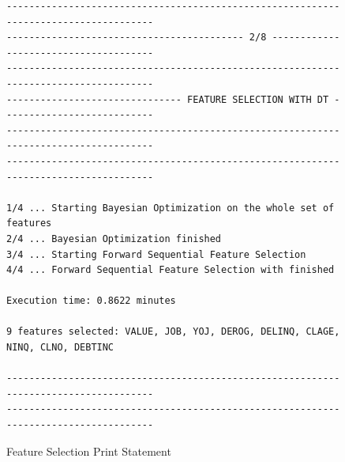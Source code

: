 \begin{figure}[H]
\centering\caption{Feature Selection Print Statement}
\label{fig:featselectprint}

{\fontsize{8.8}{11}\selectfont 
\begin{verbatim}
-------------------------------------------------------------------------------------
------------------------------------------ 2/8 --------------------------------------
-------------------------------------------------------------------------------------
------------------------------- FEATURE SELECTION WITH DT ---------------------------
-------------------------------------------------------------------------------------
------------------------------------------------------------------------------------- 

1/4 ... Starting Bayesian Optimization on the whole set of features
2/4 ... Bayesian Optimization finished
3/4 ... Starting Forward Sequential Feature Selection
4/4 ... Forward Sequential Feature Selection with finished 

Execution time: 0.8622 minutes 

9 features selected: VALUE, JOB, YOJ, DEROG, DELINQ, CLAGE, NINQ, CLNO, DEBTINC 

-------------------------------------------------------------------------------------
-------------------------------------------------------------------------------------
\end{verbatim}
}
\vspace{0em}
\end{figure}


